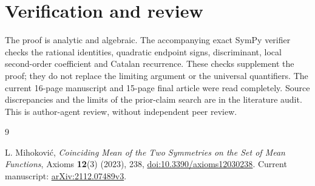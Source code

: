 \documentclass[11pt]{article}
\begin{document}
\section*{Verification and review}
The proof is analytic and algebraic. The accompanying exact SymPy
verifier checks the rational identities, quadratic endpoint signs,
discriminant, local second-order coefficient and Catalan recurrence.
These checks supplement the proof; they do not replace the limiting
argument or the universal quantifiers. The current 16-page manuscript
and 15-page final article were read completely. Source discrepancies
and the limits of the prior-claim search are in the literature audit.
This is author-agent review, without independent peer review.

\begin{thebibliography}{9}
\raggedright
{} L. Mihokovi\'c, \emph{Coinciding Mean of the Two Symmetries
on the Set of Mean Functions}, Axioms \textbf{12}(3) (2023), 238,
\href{https://doi.org/10.3390/axioms12030238}{doi:10.3390/axioms12030238}.
Current manuscript: \href{https://arxiv.org/abs/2112.07489}{arXiv:2112.07489v3}.
\end{thebibliography}
\end{document}
